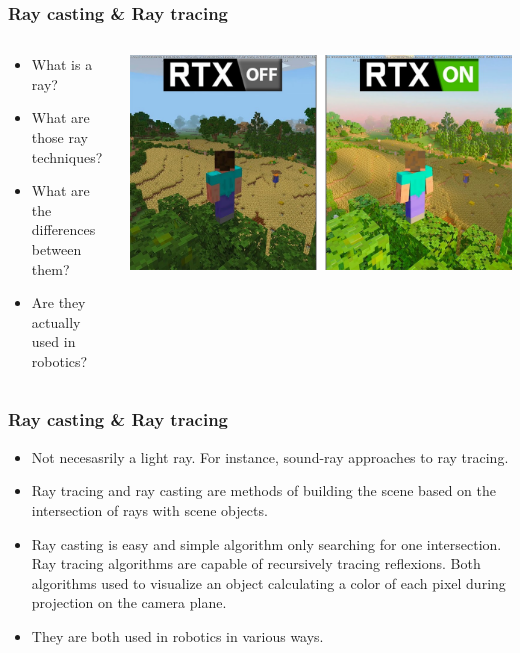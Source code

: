 \documentclass[
    11pt, %
    aspectratio=169, %
]{beamer}
\begin{document}
\begin{frame}
    \frametitle{Ray casting \& Ray tracing}
    \begin{columns}[c]
        \begin{column}{0.5\textwidth}
            \begin{itemize}
                \item What is a ray?
                \item What are those ray techniques?
                \item What are the differences between them?
                \item Are they actually used in robotics?
            \end{itemize}
        \end{column}
        \begin{column}{0.5\textwidth}
            \includegraphics[scale=0.16]{assets/minecraftrtx.jpg}
        \end{column}
    \end{columns}
    
\end{frame}

\begin{frame}
    \frametitle{Ray casting \& Ray tracing}
    \begin{itemize}
        \item Not necesasrily a light ray. For instance, sound-ray approaches to ray tracing.
        \item Ray tracing and ray casting are methods of building
              the scene based on the intersection of rays with scene objects.
        \item Ray casting is easy and simple algorithm only searching for one intersection. Ray tracing algorithms
              are capable of recursively tracing reflexions. Both algorithms used to visualize an object calculating a color
              of each pixel during projection on the camera plane.
        \item They are both used in robotics in various ways.
    \end{itemize}
\end{frame}
\end{document}
